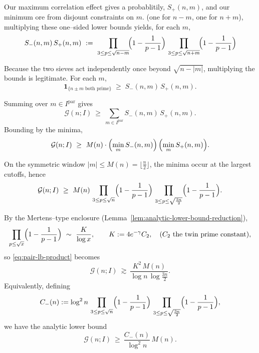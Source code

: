 \documentclass[11pt]{article}
\makeatletter
\theoremstyle{inline}
\theoremstyle{break}
\renewenvironment{proof}[1][\proofname]{%
  \par\pushQED{\qed}%
  \normalfont \topsep6\p@\@plus6\p@\relax
  \trivlist
  \item[\hskip\labelsep
        \itshape
    #1\@addpunct{.}]\mbox{}\\  %
}{%
  \popQED\endtrivlist\@endpefalse
}
\theoremstyle{break}
\theoremstyle{break}
\theoremstyle{break}
\theoremstyle{break}
\theoremstyle{inline}
\newcommand{\CminusProduct}{C_{-}}
\makeatother
\begin{document}
\begin{proof}
Our maximum correlation effect gives a probablitily, \( S_+(n,m) \), and our minimum ore from disjount constraints on \( m \).  (one 
for \(n\!-\!m\), one for \(n\!+\!m\)), multiplying these one–sided lower bounds yields, for each \(m\),
\begin{equation}
S_{-}(n,m)\,S_{+}(n,m)
\ :=\
\prod_{3\le p\le \sqrt{n-m}}\!\Bigl(1-\frac{1}{p-1}\Bigr)\,
\prod_{3\le p\le \sqrt{n+m}}\!\Bigl(1-\frac{1}{p-1}\Bigr)
\end{equation}

Because the two sieves act independently once beyond \(\sqrt{n-|m|}\),
multiplying the bounds is legitimate. For each \(m\),
\begin{equation}
\mathbf{1}_{\{\text{\(n\pm m\) both prime}\}}\;\ge\;S_-(n,m)\,S_+(n,m).
\end{equation}

Summing over \(m\in I^{\mathrm{par}}\) gives
\begin{equation}
\mathcal G(n;I)\ \ge\ \sum_{m\in I^{\mathrm{par}}} S_-(n,m)\,S_+(n,m).
\end{equation}
Bounding by the minima,
\begin{equation}
\mathcal G(n;I)\ \ge\
M(n)\cdot\Bigl(\min_{m}S_-(n,m)\Bigr)\,\Bigl(\min_{m}S_+(n,m)\Bigr).
\end{equation}

On the symmetric window \(|m|\le M(n)=\lfloor \frac{n}{2}\rfloor\), the minima
occur at the largest cutoffs, hence
\begin{equation}\label{eq:pair-lb-product}
\mathcal G(n;I)\ \ge\
M(n)\,
\prod_{3\le p\le \sqrt n}\Bigl(1-\frac{1}{p-1}\Bigr)\,
\prod_{3\le p\le \sqrt{\frac{3n}{2}}}\Bigl(1-\frac{1}{p-1}\Bigr).
\end{equation}

\medskip
\noindent
By the Mertens--type enclosure (Lemma~\ref{lem:analytic-lower-bound-reduction}),
\begin{equation}
\prod_{p\le \sqrt x}\Bigl(1-\frac{1}{p-1}\Bigr)\ \sim\ \frac{K}{\log x},
\qquad K:=4e^{-\gamma}C_2,\quad (C_2 \text{ the twin prime constant}),
\end{equation}
so \eqref{eq:pair-lb-product} becomes
\begin{equation}
\mathcal G(n;I)\ \gtrsim\
\frac{K^2\,M(n)}{\log n\,\log{\frac{3n}{2}}}.
\end{equation}
Equivalently, defining
\begin{equation}\label{eq:Cminus}
\CminusProduct(n)
:=\log^2 n\,
\prod_{3\le p\le \sqrt n}\Bigl(1-\frac{1}{p-1}\Bigr)\,
\prod_{3\le p\le \sqrt{\frac{3n}{2}}}\Bigl(1-\frac{1}{p-1}\Bigr),
\end{equation}
we have the analytic lower bound
\begin{equation}
\mathcal G(n;I)\ \ge\ \frac{\CminusProduct(n)}{\log^2 n}\,M(n).
\end{equation}


\end{proof}
\end{document}
